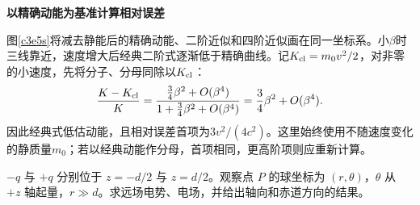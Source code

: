 \begin{solution}
\par\medskip{}\noindent\textbf{以精确动能为基准计算相对误差}\par\nobreak
图\ref{c3e5s}将减去静能后的精确动能、二阶近似和四阶近似画在同一坐标系。小$\beta$时三线靠近，速度增大后经典二阶式逐渐低于精确曲线。记$K_{\rm cl}=m_0v^2/2$，对非零的小速度，先将分子、分母同除以$K_{\rm cl}$：
\[
\frac{K-K_{\rm cl}}{K}
=\frac{\frac34\beta^2+O(\beta^4)}
       {1+\frac34\beta^2+O(\beta^4)}
=\frac34\beta^2+O(\beta^4).
\]
因此经典式低估动能，且相对误差首项为$3v^2/(4c^2)$。这里始终使用不随速度变化的静质量$m_0$；若以经典动能作分母，首项相同，更高阶项则应重新计算。
\end{solution}

\begin{question}
\begin{example}[电偶极子的远场]
$-q$ 与 $+q$ 分别位于 $z=-d/2$ 与 $z=d/2$。观察点 $P$ 的球坐标为 $(r,\theta)$，$\theta$ 从 $+z$ 轴起量，$r\gg d$。求远场电势、电场，并给出轴向和赤道方向的结果。
\end{example}
\end{question}
